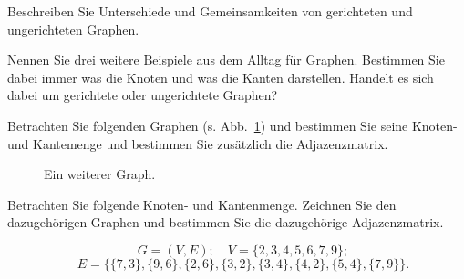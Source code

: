\begin{kontr}
Beschreiben Sie Unterschiede und Gemeinsamkeiten von gerichteten und ungerichteten Graphen.
\end{kontr}


\begin{kontr}
Nennen Sie drei weitere Beispiele aus dem Alltag für Graphen. 
Bestimmen Sie dabei immer was die Knoten und was die Kanten darstellen. 
Handelt es sich dabei um gerichtete oder ungerichtete Graphen?
\end{kontr}


\begin{kontr}
Betrachten Sie folgenden Graphen (s. Abb.~\ref{fig:kont:graph}) und bestimmen Sie seine Knoten- und Kantemenge und bestimmen Sie zusätzlich die Adjazenzmatrix.

\begin{figure}[htb]
\begin{center}
\caption{Ein weiterer Graph.}
\label{fig:kont:graph}
\end{center}
\end{figure}

\end{kontr}

\begin{kontr}
Betrachten Sie folgende Knoten- und Kantenmenge. Zeichnen Sie den dazugehörigen Graphen und bestimmen Sie die dazugehörige Adjazenzmatrix.

\[ \quad G = (V, E); \quad V = \{2,3,4,5,6,7,9\}; \] 
\[\quad E =  \{ \{7,3\},\{9,6\}, \{2,6\}, \{3,2\}, \{3,4\}, \{4,2\}, \{5,4\}, \{7,9\}\}. \]

\end{kontr}

